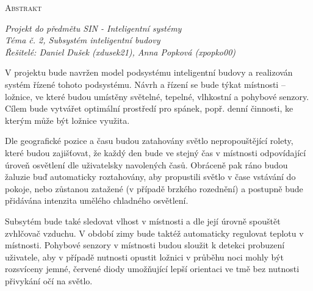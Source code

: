 \documentclass[a4paper,12pt]{article}
\renewcommand{\baselinestretch}{1.2}
\begin{document}
	

	\setlength{\parindent}{0pt}
	\vspace*{10pt}
	\LARGE \textsc{Abstrakt}
	\normalsize

	\vspace*{5pt}
	\textit{Projekt do předmětu SIN - Inteligentní systémy} \\
	\textit{Téma č. 2, Subsystém inteligentní budovy} \\
	\textit{Řešitelé: Daniel Dušek (xdusek21), Anna Popková (xpopko00)}

	\setlength{\parindent}{15pt}
	\setlength{\parskip}{15pt}
	\renewcommand{\baselinestretch}{1.5}
	\vspace*{15pt}
	V projektu bude navržen model podsystému inteligentní budovy a realizován systém řízené tohoto podsystému. Návrh a řízení se bude týkat místnosti -- ložnice, ve které budou umístěny světelné, tepelné, vlhkostní a pohybové senzory. Cílem bude vytvářet optimální prostředí pro spánek, popř. denní činnosti, ke kterým může být ložnice využita. 

	Dle geografické pozice a času budou zatahovány světlo nepropouštějící rolety, které budou zajišťovat, že každý den bude ve stejný čas v místnosti odpovídající úroveň osvětlení dle uživatelsky navolených časů. Obráceně pak ráno budou žaluzie buď automaticky roztahovány, aby propustili světlo v čase vstávání do pokoje, nebo zůstanou zatažené (v případě brzkého rozednění) a postupně bude přidávána intenzita umělého chladného osvětlení.

	Subsytém bude také sledovat vlhost v místnosti a dle její úrovně spouštět zvhlčovač vzduchu. V období zimy bude taktéž automaticky regulovat teplotu v místnosti. Pohybové senzory v místnosti budou sloužit k detekci probuzení uživatele, aby v případě nutnosti opustit ložnici v průběhu noci mohly být rozsvíceny jemné, červené diody umožňující lepší orientaci ve tmě bez nutnosti přivykání očí na světlo.
	
\end{document}
